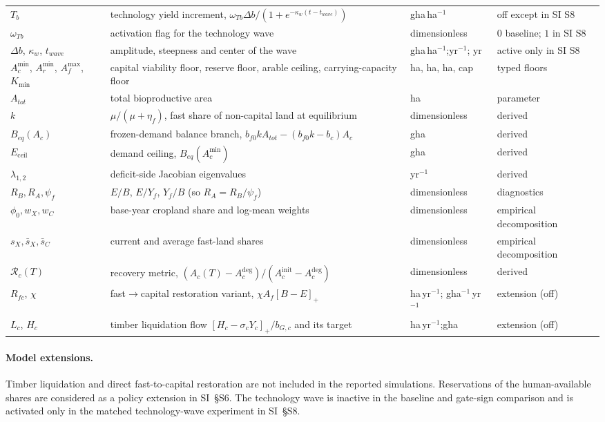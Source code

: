 \documentclass[11pt,a4paper]{article}
\newcommand{\pos}[1]{\left[#1\right]_+}
\newcommand{\Eceil}{E_{\mathrm{ceil}}}
\newcommand{\Acmin}{A_c^{\min}}
\begin{document}
\begin{longtable}{>{\raggedright\arraybackslash}p{}>{\raggedright\arraybackslash}p{}>{\raggedright\arraybackslash}p{}>{\raggedright\arraybackslash}p{}}
$T_b$ & technology yield increment, $\omega_{Tb}\Delta b/(1+e^{-\kappa_w(t-t_{wave})})$ & gha\,ha$^{-1}$ & off except in SI S8 \\
$\omega_{Tb}$ & activation flag for the technology wave & dimensionless & $0$ baseline; $1$ in SI S8 \\
$\Delta b$, $\kappa_w$, $t_{wave}$ & amplitude, steepness and center of the wave & gha\,ha$^{-1}$;\newline yr$^{-1}$; yr & active only in SI S8 \\
$\Acmin$, $A_r^{\min}$, $A_f^{\max}$, $K_{\min}$ & capital viability floor, reserve floor, arable ceiling, carrying-capacity floor & ha, ha, ha, cap & typed floors \\
$A_{tot}$ & total bioproductive area & ha & parameter \\
$k$ & $\mu/(\mu+\eta_f)$, fast share of non-capital land at equilibrium & dimensionless & derived \\
$B_{eq}(A_c)$ & frozen-demand balance branch, $b_{f0}kA_{tot}-(b_{f0}k-b_c)A_c$ & gha & derived \\
$\Eceil$ & demand ceiling, $B_{eq}(\Acmin)$ & gha & derived \\
$\lambda_{1,2}$ & deficit-side Jacobian eigenvalues & yr$^{-1}$ & derived \\
$R_B,R_A,\psi_f$ & $E/B$, $E/Y_f$, $Y_f/B$ (so $R_A=R_B/\psi_f$) & dimensionless & diagnostics \\
$\phi_0,w_X,w_C$ & base-year cropland share and log-mean weights & dimensionless & empirical decomposition \\
$s_X,\bar s_X,\bar s_C$ & current and average fast-land shares & dimensionless & empirical decomposition \\
$\mathcal R_c(T)$ & recovery metric, $(A_c(T)-A_c^{\mathrm{deg}})/(A_c^{\mathrm{init}}-A_c^{\mathrm{deg}})$ & dimensionless & derived \\
$R_{fc}$, $\chi$ & fast$\to$capital restoration variant, $\chi A_f\pos{B-E}$ & ha\,yr$^{-1}$; gha$^{-1}$\,yr$^{-1}$ & extension (off) \\
$L_c$, $H_c$ & timber liquidation flow $\pos{H_c-\sigma_cY_c}/b_{G,c}$ and its target & ha\,yr$^{-1}$;\newline gha & extension (off) \\
\bottomrule
\end{longtable}

\paragraph{Model extensions.} Timber liquidation and direct fast-to-capital restoration are not included in the reported simulations. Reservations of the human-available shares are considered as a policy extension in SI~\S S6. The technology wave is inactive in the baseline and gate-sign comparison and is activated only in the matched technology-wave experiment in SI~\S S8.
\end{document}
